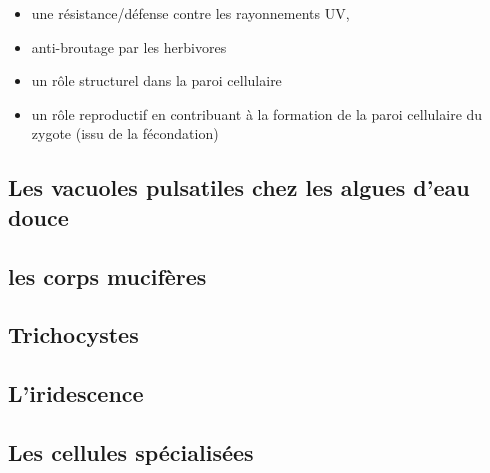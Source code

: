 \documentclass[
]{book}
\providecommand{\tightlist}{%
  \setlength{\itemsep}{0pt}\setlength{\parskip}{0pt}}
\begin{document}
\begin{itemize}
\tightlist
\item
  une résistance/défense contre les rayonnements UV,
\item
  anti-broutage par les herbivores
\item
  un rôle structurel dans la paroi cellulaire
\item
  un rôle reproductif en contribuant à la formation de la paroi cellulaire du zygote (issu de la fécondation)
\end{itemize}

\hypertarget{les-vacuoles-pulsatiles-chez-les-algues-deau-douce}{%
\subsection{Les vacuoles pulsatiles chez les algues d'eau douce}\label{les-vacuoles-pulsatiles-chez-les-algues-deau-douce}}

\hypertarget{les-corps-mucifuxe8res}{%
\subsection{les corps mucifères}\label{les-corps-mucifuxe8res}}

\hypertarget{trichocystes}{%
\subsection{Trichocystes}\label{trichocystes}}

\hypertarget{liridescence}{%
\subsection{L'iridescence}\label{liridescence}}

\hypertarget{les-cellules-spuxe9cialisuxe9es}{%
\subsection{Les cellules spécialisées}\label{les-cellules-spuxe9cialisuxe9es}}

  
\end{document}

